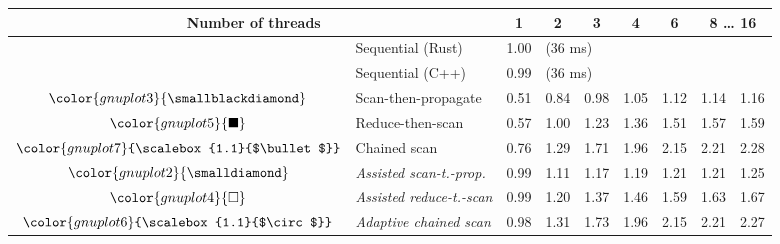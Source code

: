 \begin{tabular}{clrrrrrrr}
\toprule
\multicolumn{2}{c}{\textbf{Number of threads}} & \multicolumn{1}{c}{\textbf{ 1 }} & \multicolumn{1}{c}{\textbf{ 2 }} & \multicolumn{1}{c}{\textbf{ 3 }} & \multicolumn{1}{c}{\textbf{ 4 }} & \multicolumn{1}{c}{\textbf{ 6 }} & \multicolumn{2}{c}{\textbf{ 8 } \dots \textbf{ 16 }} \\
\midrule
& Sequential (Rust) & \multicolumn{1}{r}{ 1.00 } & \multicolumn{ 6 }{l}{(36 ms)} \\
& Sequential (C++) & \multicolumn{1}{r}{ 0.99 } & \multicolumn{ 6 }{l}{(36 ms)} \\
\rowcolor{gnuplot3!10}$\color{gnuplot3}{\smallblackdiamond}$ & Scan-then-propagate & \cellcolor{gnuplot3!10} 0.51 & \cellcolor{gnuplot3!10} 0.84 & \cellcolor{gnuplot3!10} 0.98 & \cellcolor{gnuplot3!10} 1.05 & \cellcolor{gnuplot3!10} 1.12 & \cellcolor{gnuplot3!10} 1.14 & \cellcolor{gnuplot3!10} 1.16 \\
\rowcolor{gnuplot5!10}$\color{gnuplot5}{\blacksquare}$ & Reduce-then-scan & \cellcolor{gnuplot5!10} 0.57 & \cellcolor{gnuplot5!10} 1.00 & \cellcolor{gnuplot5!10} 1.23 & \cellcolor{gnuplot5!10} 1.36 & \cellcolor{gnuplot5!10} 1.51 & \cellcolor{gnuplot5!10} 1.57 & \cellcolor{gnuplot5!10} 1.59 \\
\rowcolor{gnuplot7!10}$\color{gnuplot7}{\scalebox{1.1}{$\bullet$}}$ & Chained scan & \cellcolor{gnuplot7!10} 0.76 & \cellcolor{gnuplot7!10} 1.29 & \cellcolor{gnuplot7!10} 1.71 & \cellcolor{gnuplot7!10} 1.96 & \cellcolor{gnuplot7!10} 2.15 & \cellcolor{gnuplot7!10} 2.21 & \cellcolor{gnuplot7!10} 2.28 \\
\rowcolor{gnuplot2!30}$\color{gnuplot2}{\smalldiamond}$ & \textit{Assisted scan-t.-prop.} & \cellcolor{gnuplot2!30} 0.99 & \cellcolor{gnuplot2!30} 1.11 & \cellcolor{gnuplot2!30} 1.17 & \cellcolor{gnuplot2!30} 1.19 & \cellcolor{gnuplot2!30} 1.21 & \cellcolor{gnuplot2!30} 1.21 & \cellcolor{gnuplot2!30} 1.25 \\
\rowcolor{gnuplot4!30}$\color{gnuplot4}{\square}$ & \textit{Assisted reduce-t.-scan} & \cellcolor{gnuplot4!30} 0.99 & \cellcolor{gnuplot4!30} 1.20 & \cellcolor{gnuplot4!30} 1.37 & \cellcolor{gnuplot4!30} 1.46 & \cellcolor{gnuplot4!30} 1.59 & \cellcolor{gnuplot4!30} 1.63 & \cellcolor{gnuplot4!30} 1.67 \\
\rowcolor{gnuplot6!30}$\color{gnuplot6}{\scalebox{1.1}{$\circ$}}$ & \textit{Adaptive chained scan} & \cellcolor{gnuplot6!30} 0.98 & \cellcolor{gnuplot6!30} 1.31 & \cellcolor{gnuplot6!30} 1.73 & \cellcolor{gnuplot6!30} 1.96 & \cellcolor{gnuplot6!30} 2.15 & \cellcolor{gnuplot6!30} 2.21 & \cellcolor{gnuplot6!30} 2.27 \\

\end{tabular}
